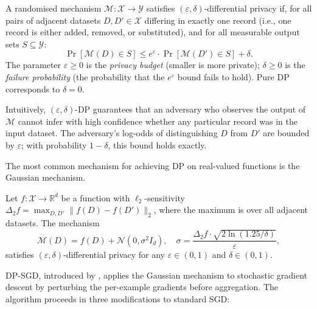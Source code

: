 \begin{definition}
\label{def:dp}
A randomised mechanism $\mathcal{M}: \mathcal{X} \to \mathcal{Y}$ satisfies $(\varepsilon, \delta)$-differential privacy if, for all pairs of adjacent datasets $D, D' \in \mathcal{X}$ differing in exactly one record (i.e., one record is either added, removed, or substituted), and for all measurable output sets $S \subseteq \mathcal{Y}$:
\begin{equation}
  \label{eq:ch15-dp}
  \Pr[\mathcal{M}(D) \in S] \leq e^{\varepsilon} \cdot \Pr[\mathcal{M}(D') \in S] + \delta.
\end{equation}
The parameter $\varepsilon \geq 0$ is the \emph{privacy budget} (smaller is more private); $\delta \geq 0$ is the \emph{failure probability} (the probability that the $e^{\varepsilon}$ bound fails to hold). Pure DP corresponds to $\delta = 0$.
\end{definition}

Intuitively, $(\varepsilon, \delta)$-DP guarantees that an adversary who observes the output of $\mathcal{M}$ cannot infer with high confidence whether any particular record was in the input dataset. The adversary's log-odds of distinguishing $D$ from $D'$ are bounded by $\varepsilon$; with probability $1-\delta$, this bound holds exactly.

The most common mechanism for achieving DP on real-valued functions is the Gaussian mechanism.

\begin{theorem}
\label{thm:gaussian-mechanism}
Let $f: \mathcal{X} \to \mathbb{R}^d$ be a function with $\ell_2$-sensitivity $\Delta_2 f = \max_{D, D'} \|f(D) - f(D')\|_2$, where the maximum is over all adjacent datasets. The mechanism
\begin{equation}
  \label{eq:ch15-gaussian}
  \mathcal{M}(D) = f(D) + \mathcal{N}(0, \sigma^2 I_d),
  \quad \sigma = \frac{\Delta_2 f \cdot \sqrt{2 \ln(1.25/\delta)}}{\varepsilon},
\end{equation}
satisfies $(\varepsilon, \delta)$-differential privacy for any $\varepsilon \in (0, 1)$ and $\delta \in (0, 1)$.
\end{theorem}

DP-SGD, introduced by \citet{abadi2016deep}, applies the Gaussian mechanism to stochastic gradient descent by perturbing the per-example gradients before aggregation. The algorithm proceeds in three modifications to standard SGD:

